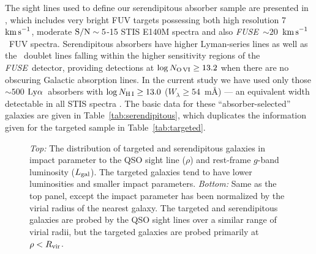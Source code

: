 \documentclass[twocolumn,twocolappendix,tighten,times]{aastex6}
\newcommand{\OVI}{\ion{O}{6}}
\newcommand{\eqw}{\ensuremath{W_{\lambda}}}
\newcommand{\fuse}{{\sl FUSE}}
\newcommand{\kms}{\ensuremath{{\rm km\,s}^{-1}}}
\newcommand{\lya}{\ensuremath{{\rm Ly}\alpha}}
\begin{document}
The sight lines used to define our serendipitous absorber
sample are presented in \citet[][see also
\citealt{tilton12}]{danforth08}, which includes very bright FUV
targets possessing both high resolution 7~\kms, moderate ${\rm
S/N}\sim5$-15 STIS E140M spectra and also \fuse\ $\sim20$~\kms\ FUV
spectra. Serendipitous absorbers have higher Lyman-series 
lines as well as the \OVI\ doublet lines falling
within the higher sensitivity regions of the \fuse\ detector, providing
detections at $\log{N_{\rm O\,VI}} \geq 13.2$ \citep{danforth05,
stocke06} when there are no obscuring Galactic absorption lines. In the
current study we have used only those $\sim500$ \lya\ absorbers with
$\log{N_{\rm H\,I}} \geq 13.0$  ($\eqw \geq 54$~m\AA) --- an 
equivalent width detectable in all STIS spectra \citep{danforth08}. The
basic data for these ``absorber-selected'' galaxies are given in
Table~\ref{tab:serendipitous}, which duplicates the information given
for the targeted sample in Table~\ref{tab:targeted}.




\clearpage

\begin{figure}[!t]
\caption{\textit{Top:} The distribution of targeted and serendipitous galaxies in impact parameter to the QSO sight line ($\rho$) and rest-frame $g$-band luminosity ($L_{\rm gal}$). The targeted galaxies tend to have lower luminosities and smaller impact parameters.  \textit{Bottom:} Same as the top panel, except the impact parameter has been normalized by the virial radius of the nearest galaxy. The targeted and serendipitous galaxies are probed by the QSO sight lines over a similar range of virial radii, but the targeted galaxies are probed primarily at $\rho<R_{\rm vir}$. \label{fig:Lrho}}
\end{figure}




\end{document}
